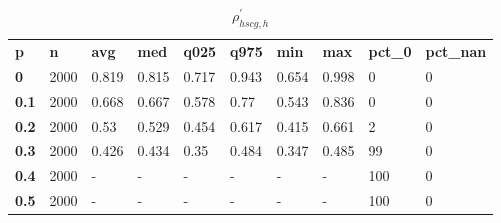 \begin{table}[h]
 \centering 
\footnotesize
\caption{$\rho_{hscg,h}^\prime $}
\label{tab:alphahscgh}
\begin{tabular}[h]{| l l l l l l l l l l|
    } \hline
\textbf{ p} & \textbf{ n} & \textbf{ avg} & \textbf{ med} & \textbf{ q025} & \textbf{ q975} & \textbf{ min} & \textbf{ max} & \textbf{ pct\_0} & \textbf{ pct\_nan}
           \\
  \textbf{  0} & 2000 & 0.819 & 0.815 & 0.717 & 0.943 & 0.654 & 0.998 &   0 & 0
           \\
  \textbf{0.1} & 2000 & 0.668 & 0.667 & 0.578 &  0.77 & 0.543 & 0.836 &   0 & 0
           \\
  \textbf{0.2} & 2000 &  0.53 & 0.529 & 0.454 & 0.617 & 0.415 & 0.661 &   2 & 0
           \\
  \textbf{0.3} & 2000 & 0.426 & 0.434 &  0.35 & 0.484 & 0.347 & 0.485 &  99 & 0
           \\
  \textbf{0.4} & 2000 & - & - & - & - & - & - & 100 & 0
           \\
  \textbf{0.5} & 2000 & - & - & - & - & - & - & 100 & 0
           \\
 \hline \end{tabular}
 \end{table}
